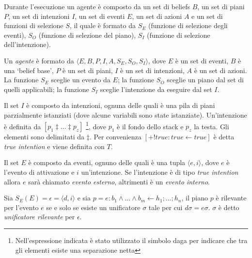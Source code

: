 \smallskip
Durante l'esecuzione un agente è composto da un set di beliefs $B$, un set di piani $P$, un set di intenzioni $I$, un set di eventi $E$, un set di azioni $A$ e un set di funzioni di selezione $S$, il quale è formato da $S_E$ (funzione di selezione degli eventi), $S_O$ (funzione di selezione del piano), $S_I$ (funzione di selezione dell'intenzione).

\smallskip
\begin{defn}
Un \textit{agente} è formato da $\langle E,B,P,I,A,S_E,S_O,S_I \rangle$, dove $E$ è un set di eventi, $B$ è una `belief base', $P$ è un set di piani, $I$ è un set di intenzioni, $A$ è un set di azioni. La funzione $S_E$ sceglie un evento da $E$; la funzione $S_O$ sceglie un piano dal set di quelli applicabili; la funzione $S_I$ sceglie l'intenzione da eseguire dal set $I$.
\end{defn}

\smallskip
\begin{defn}
Il set $I$ è composto da intenzioni, ognuna delle quali è una pila di piani parzialmente istanziati (dove alcune variabili sono state istanziate). Un'intenzione è definita da $[p_1 \ddagger \ldots \ddagger p_z]$ \footnote{Nell'espressione indicata è stato utilizzato il simbolo daga per indicare che tra gli elementi esiste una separazione netta}, dove $p_1$ è il fondo dello stack e $p_z$ la testa. Gli elementi sono delimitati da $\ddagger$. Per convenienza $[+!true : true \leftarrow true]$ è detta \textit{true intention} e viene definita con $T$.
\end{defn}

\smallskip
\begin{defn}
Il set $E$ è composto da eventi, ognuno delle quali è una tupla $\langle e, i \rangle$, dove $e$ è l'evento di attivazione e $i$ un'intenzione. Se l'intenzione è di tipo \textit{true intention} allora $e$ sarà chiamato \textit{evento esterno}, altrimenti è un \textit{evento interno}.
\end{defn}

\smallskip
\begin{defn}
Sia $S_E(E) = \epsilon = \langle d, i \rangle$ e sia $p = e : b_1 \land \ldots \land b_m \leftarrow h_1; \ldots; h_n$, il piano $p$ è rilevante per l'evento $e$ se e solo se esiste un unificatore $\sigma$ tale per cui $d\sigma = e\sigma$.
$\sigma$ è detto \textit{unificatore rilevante} per $\epsilon$.
\end{defn}

